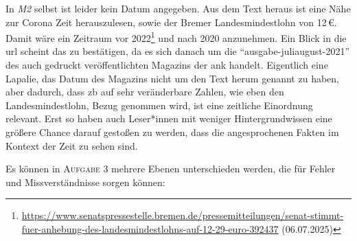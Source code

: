 In \emph{M2} selbst ist leider kein Datum angegeben. Aus dem Text heraus ist eine Nähe zur Corona Zeit herauszulesen, sowie der Bremer Landesmindestlohn von 12\,€. Damit wäre ein Zeitraum vor 2022\footnote{
    \url{https://www.senatspressestelle.bremen.de/pressemitteilungen/senat-stimmt-fuer-anhebung-des-landesmindestlohns-auf-12-29-euro-392437} (06.07.2025)
} und nach 2020 anzunehmen. Ein Blick in die \gls{url} scheint das zu bestätigen, da es sich danach um die \enquote{ausgabe-juliaugust-2021} des auch gedruckt veröffentlichten Magazins der \gls{ank} handelt. Eigentlich eine Lapalie, das Datum des Magazins nicht um den Text herum genannt zu haben, aber dadurch, dass \gls{zb} auf sehr veränderbare Zahlen, wie eben den Landesmindestlohn, Bezug genommen wird, ist eine zeitliche Einordnung relevant. Erst so haben auch Leser*innen mit weniger Hintergrundwissen eine größere Chance darauf gestoßen zu werden, dass die angesprochenen Fakten im Kontext der Zeit zu sehen sind. 



Es können in \textsc{Aufgabe 3} mehrere Ebenen unterschieden werden, die für Fehler und Missverständnisse sorgen können:

